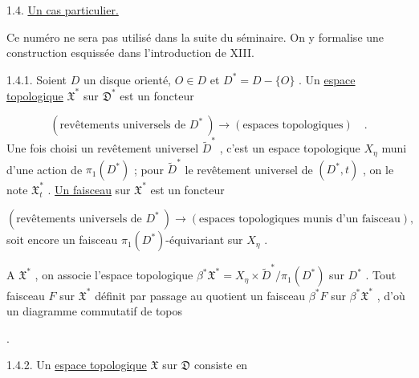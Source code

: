 1.4. \underline{Un cas particulier.}

Ce numéro ne sera pas utilisé dans la suite du séminaire. On y formalise une
construction esquissée dans l'introduction de XIII.

1.4.1. Soient $D$ un disque orienté, $O \in D$ et $D^* = D-\{O\}$ . Un \underline{espace topologique} $\mathfrak{X}^*$ sur $\mathfrak{D}^*$ est un foncteur

\begin{equation*}
(\mbox{revêtements universels de } D^*\ ) \longrightarrow (\mbox{espaces topologiques}) \quad .
\end{equation*}
Une fois choisi un revêtement universel $\widetilde{D}^*$ , c'est un espace topologique $X_\eta$ muni d'une action de $\pi_1(D^*)$ ; pour $\widetilde{D}^*$ le revêtement universel de $(D^*, t)$ , on le note $\mathfrak{X}^*_t$ . \underline{Un faisceau} sur $\mathfrak{X}^*$ est un foncteur

\begin{equation*}
(\mbox{revêtements universels de } D^*\ ) \longrightarrow (\mbox{espaces topologiques munis d'un faisceau}),
\end{equation*}
soit encore un faisceau $\pi_1(D^*)$-équivariant sur $X_\eta$ .

A $\mathfrak{X}^*$ , on associe l'espace topologique $\beta^* \mathfrak{X}^* = X_\eta \times \widetilde{D}^*/\pi_1(D^*)$ sur $D^*$ . Tout faisceau $F$ sur $\mathfrak{X}^*$ définit par passage au quotient un faisceau $\beta^*F$ sur $\beta^* \mathfrak{X}^*$ , d'où un diagramme commutatif de topos

\begin{center}
\quad .
\end{center}
1.4.2. Un \underline{espace topologique} $\mathfrak{X}$ sur $\mathfrak{D}$ consiste en

